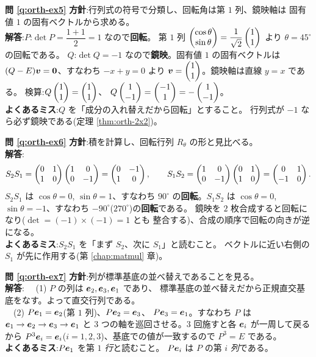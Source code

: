 \bigskip
\noindent\textbf{問 \ref{q:orth-ex5}}\quad
\textbf{方針}:行列式の符号で分類し、回転角は第 $1$ 列、鏡映軸は
固有値 $1$ の固有ベクトルから求める。\\
\textbf{解答}:$P$:$\det P = \dfrac{1 + 1}{2} = 1$ なので\textbf{回転}。
第 $1$ 列 $\begin{pmatrix}\cos\theta \\ \sin\theta\end{pmatrix}
= \dfrac{1}{\sqrt{2}}\begin{pmatrix}1 \\ 1\end{pmatrix}$ より $\theta = 45^\circ$ の回転である。
$Q$:$\det Q = -1$ なので\textbf{鏡映}。固有値 $1$ の固有ベクトルは
$(Q - E)\bm{v} = \bm{0}$、すなわち $-x + y = 0$ より
$\bm{v} = \begin{pmatrix}1 \\ 1\end{pmatrix}$。鏡映軸は直線 $y = x$ である。
検算:$Q\begin{pmatrix}1 \\ 1\end{pmatrix} = \begin{pmatrix}1 \\ 1\end{pmatrix}$、
$Q\begin{pmatrix}1 \\ -1\end{pmatrix} = \begin{pmatrix}-1 \\ 1\end{pmatrix} = -\begin{pmatrix}1 \\ -1\end{pmatrix}$。\\
\textbf{よくあるミス}:$Q$ を「成分の入れ替えだから回転」とすること。
行列式が $-1$ なら必ず鏡映である(定理 \ref{thm:orth-2x2})。

\bigskip
\noindent\textbf{問 \ref{q:orth-ex6}}\quad
\textbf{方針}:積を計算し、回転行列 $R_\theta$ の形と見比べる。\\
\textbf{解答}:
\[
S_2 S_1 = \begin{pmatrix}0 & 1 \\ 1 & 0\end{pmatrix}\begin{pmatrix}1 & 0 \\ 0 & -1\end{pmatrix}
= \begin{pmatrix}0 & -1 \\ 1 & 0\end{pmatrix}, \qquad
S_1 S_2 = \begin{pmatrix}1 & 0 \\ 0 & -1\end{pmatrix}\begin{pmatrix}0 & 1 \\ 1 & 0\end{pmatrix}
= \begin{pmatrix}0 & 1 \\ -1 & 0\end{pmatrix}.
\]
$S_2 S_1$ は $\cos\theta = 0$, $\sin\theta = 1$、すなわち
$90^\circ$ の\textbf{回転}。$S_1 S_2$ は $\cos\theta = 0$,
$\sin\theta = -1$、すなわち $-90^\circ$($270^\circ$)の\textbf{回転}である。
鏡映を $2$ 枚合成すると回転になり($\det = (-1) \times (-1) = 1$ とも
整合する)、合成の順序で回転の向きが逆になる。\\
\textbf{よくあるミス}:$S_2 S_1$ を「まず $S_2$、次に $S_1$」と読むこと。
ベクトルに近い右側の $S_1$ が先に作用する(第 \ref{chap:matmul} 章)。

\bigskip
\noindent\textbf{問 \ref{q:orth-ex7}}\quad
\textbf{方針}:列が標準基底の並べ替えであることを見る。\\
\textbf{解答}:
　(1) $P$ の列は $\bm{e}_2, \bm{e}_3, \bm{e}_1$ であり、
標準基底の並べ替えだから正規直交基底をなす。よって直交行列である。\\
　(2) $P\bm{e}_1 = \bm{e}_2$(第 $1$ 列)、$P\bm{e}_2 = \bm{e}_3$、
$P\bm{e}_3 = \bm{e}_1$。すなわち $P$ は
$\bm{e}_1 \to \bm{e}_2 \to \bm{e}_3 \to \bm{e}_1$ と
$3$ つの軸を巡回させる。$3$ 回施すと各 $\bm{e}_i$ が一周して戻るから
$P^3\bm{e}_i = \bm{e}_i$($i = 1, 2, 3$)、基底での値が一致するので
$P^3 = E$ である。\\
\textbf{よくあるミス}:$P\bm{e}_1$ を第 $1$ \emph{行}と読むこと。
$P\bm{e}_i$ は $P$ の第 $i$ \emph{列}である。

